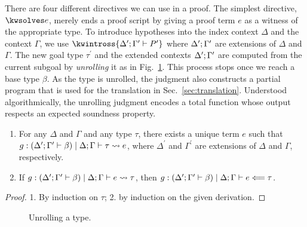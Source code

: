 There are four different directives we can use in a proof. The
simplest directive, $\kwsolves e$, merely ends a proof script by
giving a proof term $e$ as a witness of the appropriate type.
%
To introduce hypotheses into the index context $\Delta$ and the context
$\Gamma$, we use $\kwintross \hypoth{\goalctx{^\prime}}{P^\prime}$ where
$\Delta^\prime; \Gamma^\prime$ are extensions of $\Delta$ and $\Gamma$.
%
The new goal type $\tau^\prime$ and the extended contexts $\Delta^\prime; \Gamma^\prime$
are computed from the current subgoal by \emph{unrolling} it as in
Fig.~\ref{fig:unroll}.
This process stops once we reach a base type $\beta$.
As the type is unrolled, the judgment also constructs a partial program
that is used for the translation in Sec.~\ref{sec:translation}.
Understood algorithmically, the unrolling judgment encodes a total function
whose output respects an expected soundness property.
\begin{thm}
  \begin{enumerate}
  \item
    For any $\Delta$ and $\Gamma$ and any type $\tau$,
    there exists a unique term $e$ such that
    $g : (\Delta^\prime; \Gamma^\prime \vdash \beta) \mid \Delta; \Gamma \vdash \tau \rightsquigarrow e$, where
    $\Delta^\prime$ and $\Gamma^\prime$ are extensions of $\Delta$ and $\Gamma$,
    respectively.

  \item
    If $
    g : 
      (\Delta^\prime; \Gamma^\prime \vdash \beta)
     \mid \Delta; \Gamma \vdash e \rightsquigarrow \tau
    $, then $
    \belchkjudg{
      g : \goalwith{\goalctx{^\prime}}{\beta} \mid \goalctx{}
    }{e}{\tau}
    $.
  \end{enumerate}
\end{thm}
%
\begin{proof}
  1. By induction on $\tau$; 2. by induction on the given derivation.
\end{proof}

\begin{figure}[htp]
  \caption{Unrolling a \Beluga{} type.}%
  \label{fig:unroll}%
\end{figure}


